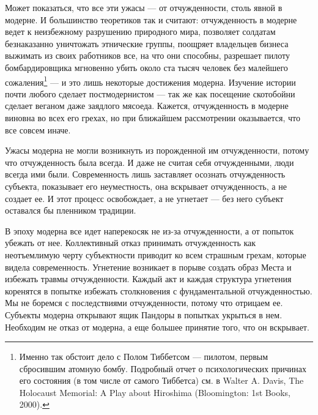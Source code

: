 \documentclass[12pt]{book}
\begin{document}
Может показаться, что все эти ужасы --- от отчужденности, столь явной в модерне. И большинство теоретиков так и считают: отчужденность в модерне ведет к неизбежному разрушению природного мира, позволяет солдатам безнаказанно уничтожать этнические группы, поощряет владельцев бизнеса выжимать из своих работников все, на что они способны, разрешает пилоту бомбардировщика мгновенно убить около ста тысяч человек без малейшего сожаления\footnote{Именно так обстоит дело с Полом Тиббетсом --- пилотом, первым сбросившим атомную бомбу. Подробный отчет о психологических причинах его состояния (в том числе от самого Тиббетса) см. в Walter A. Davis, The Holocaust Memorial: A Play about Hiroshima (Bloomington: 1st Books, 2000).} --- и это лишь некоторые достижения модерна. Изучение истории почти любого сделает постмодернистом --- так же как посещение скотобойни сделает веганом даже заядлого мясоеда. Кажется, отчужденность в модерне виновна во всех его грехах, но при ближайшем рассмотрении оказывается, что все совсем иначе.

Ужасы модерна не могли возникнуть из порожденной им отчужденности, потому что отчужденность была всегда. И даже не считая себя отчужденными, люди всегда ими были. Современность лишь заставляет осознать отчужденность субъекта, показывает его неуместность, она вскрывает отчужденность, а не создает ее. И этот процесс освобождает, а не угнетает --- без него субъект оставался бы пленником традиции.

В эпоху модерна все идет наперекосяк не из-за отчужденности, а от попыток убежать от нее. Коллективный отказ принимать отчужденность как неотъемлимую черту субъектности приводит ко всем страшным грехам, которые видела современность. Угнетение возникает в порыве создать образ Места и избежать травмы отчужденности. Каждый акт и каждая структура угнетения коренятся в попытке избежать столкновения с фундаментальной отчужденностью. Мы не боремся с последствиями отчужденности, потому что отрицаем ее. Субъекты модерна открывают ящик Пандоры в попытках укрыться в нем. Необходим не отказ от модерна, а еще большее принятие того, что он вскрывает.
\end{document}
